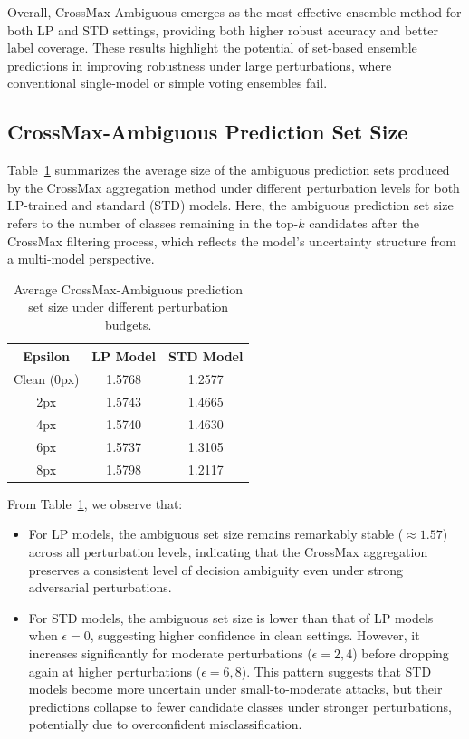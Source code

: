 Overall, CrossMax-Ambiguous emerges as the most effective ensemble method for both LP and STD settings, providing both higher robust accuracy and better label coverage. These results highlight the potential of set-based ensemble predictions in improving robustness under large perturbations, where conventional single-model or simple voting ensembles fail.


\subsection{CrossMax-Ambiguous Prediction Set Size}
\indent

Table~\ref{tab:crossmax_ambiguous} summarizes the average size of the ambiguous prediction sets produced by the CrossMax aggregation method under different perturbation levels for both LP-trained and standard (STD) models. Here, the ambiguous prediction set size refers to the number of classes remaining in the top-$k$ candidates after the CrossMax filtering process, which reflects the model's uncertainty structure from a multi-model perspective.

\begin{table}[h]
\centering
\caption{Average CrossMax-Ambiguous prediction set size under different perturbation budgets.}
\label{tab:crossmax_ambiguous}
\begin{tabular}{c|cc}
\hline
\textbf{Epsilon} & \textbf{LP Model} & \textbf{STD Model} \\
\hline
Clean (0px)   & 1.5768 & 1.2577 \\
2px   & 1.5743 & 1.4665 \\
4px   & 1.5740 & 1.4630 \\
6px   & 1.5737 & 1.3105 \\
8px   & 1.5798 & 1.2117 \\
\hline
\end{tabular}
\end{table}

From Table~\ref{tab:crossmax_ambiguous}, we observe that:
\begin{itemize}
    \item For LP models, the ambiguous set size remains remarkably stable ($\approx 1.57$) across all perturbation levels, indicating that the CrossMax aggregation preserves a consistent level of decision ambiguity even under strong adversarial perturbations.
    \item For STD models, the ambiguous set size is lower than that of LP models when $\epsilon=0$, suggesting higher confidence in clean settings. However, it increases significantly for moderate perturbations ($\epsilon=2,4$) before dropping again at higher perturbations ($\epsilon=6,8$). This pattern suggests that STD models become more uncertain under small-to-moderate attacks, but their predictions collapse to fewer candidate classes under stronger perturbations, potentially due to overconfident misclassification.
\end{itemize}





